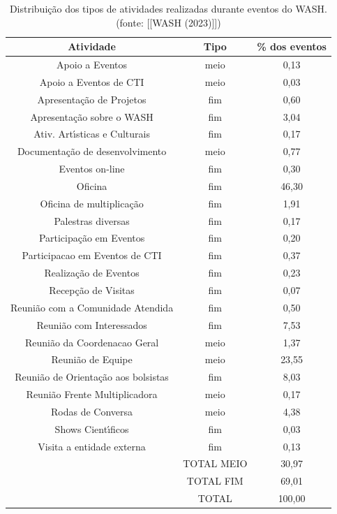 \documentclass[
12pt,		%
openright,	%
twoside,  %
a4paper,			%
chapter=TITLE,		%
english,			%
french,				%
spanish,			%
brazil				%
]{USPSC-classe/USPSC}
\begin{document}
\begin{table}[htb]
\tiny
\caption{\label{5015e9b294e33efceb2e6222fb8f94700ecd74f3}Distribui\c{c}\~ao dos tipos de atividades realizadas durante eventos do WASH. (fonte:  [[WASH (2023)]])}

\centering
\begin{tabular}{|c|c|c|}
\hline
Atividade  &  Tipo  &  \% dos eventos \\
\hline
Apoio a Eventos  &  meio  &  0,13 \\
Apoio a Eventos de CTI  &  meio  &  0,03 \\
Apresenta\c{c}\~ao de Projetos  &  fim  &  0,60 \\
Apresenta\c{c}\~ao sobre o WASH  &  fim  &  3,04 \\
Ativ. Art\'{\i}sticas e Culturais  &  fim  &  0,17 \\
Documenta\c{c}\~ao de desenvolvimento  &  meio  &  0,77 \\
Eventos on-line  &  fim  &  0,30 \\
Oficina  &  fim  &  46,30 \\
Oficina de multiplica\c{c}\~ao  &  fim  &  1,91 \\
Palestras diversas  &  fim  &  0,17 \\
Participa\c{c}\~ao em Eventos  &  fim  &  0,20 \\
Participacao em Eventos de CTI  &  fim  &  0,37 \\
Realiza\c{c}\~ao de Eventos  &  fim  &  0,23 \\
Recep\c{c}\~ao de Visitas  &  fim  &  0,07 \\
Reuni\~ao com a Comunidade Atendida  &  fim  &  0,50 \\
Reuni\~ao com Interessados  &  fim  &  7,53 \\
Reuni\~ao da Coordenacao Geral  &  meio  &  1,37 \\
Reuni\~ao de Equipe  &  meio  &  23,55 \\
Reuni\~ao de Orienta\c{c}\~ao aos bolsistas  &  fim  &  8,03 \\
Reuni\~ao Frente Multiplicadora  &  meio  &  0,17 \\
Rodas de Conversa  &  meio  &  4,38 \\
Shows Cient\'{\i}ficos  &  fim  &  0,03 \\
Visita a entidade externa  &  fim  &  0,13 \\
\hline
  &  TOTAL MEIO  &  30,97 \\
  &  TOTAL FIM  &  69,01  \\
  &  TOTAL  &  100,00 \\
\hline
\end{tabular}
\end{table}
\end{document}
